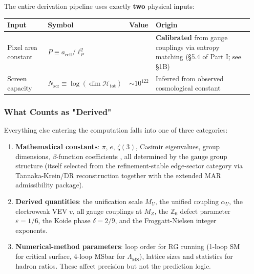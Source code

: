 The entire derivation pipeline uses exactly \textbf{two} physical inputs:

{\def\LTcaptype{none} %
\begin{longtable}[]{@{}>{\RaggedRight\arraybackslash}p{}>{\RaggedRight\arraybackslash}p{}>{\RaggedRight\arraybackslash}p{}>{\RaggedRight\arraybackslash}p{}@{}}
\toprule\noalign{}
Input & Symbol & Value & Origin \\
\midrule\noalign{}
\endhead
\bottomrule\noalign{}
\endlastfoot
Pixel area constant & \(P \equiv a_{\text{cell}}/\ell_P^2\) & 1.63094 & \textbf{Calibrated} from gauge couplings via entropy matching (\S{}5.4 of Part I; see \S{}1B) \\
Screen capacity & \(N_{\mathrm{scr}} \equiv \log(\dim\mathcal{H}_{\text{tot}})\) & \(\sim 10^{122}\) & Inferred from observed cosmological constant \\
\end{longtable}
}

\subsubsection{What Counts as "Derived"}\label{12-what-counts-as-derived}

Everything else entering the computation falls into one of three categories:

\begin{enumerate}
\def\labelenumi{\arabic{enumi}.}
\item
  \textbf{Mathematical constants}: \(\pi\), \(e\), \(\zeta(3)\), Casimir eigenvalues, group dimensions, \(\beta\)-function coefficients , all determined by the gauge group structure (itself selected from the refinement-stable edge-sector category via Tannaka-Krein/DR reconstruction together with the extended MAR admissibility package).
\item
  \textbf{Derived quantities}: the unification scale \(M_U\), the unified coupling \(\alpha_U\), the electroweak VEV \(v\), all gauge couplings at \(M_Z\), the \(\mathbb{Z}_6\) defect parameter \(\varepsilon = 1/6\), the Koide phase \(\delta = 2/9\), and the Froggatt-Nielsen integer exponents.
\item
  \textbf{Numerical-method parameters}: loop order for RG running (1-loop SM for critical surface, 4-loop MSbar for \(\Lambda_{\overline{\text{MS}}}\)), lattice sizes and statistics for hadron ratios. These affect precision but not the prediction logic.
\end{enumerate}

